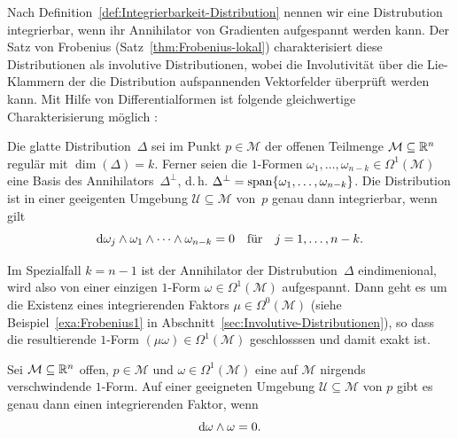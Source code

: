 Nach Definition~\ref{def:Integrierbarkeit-Distribution} nennen wir
eine Distrubution integrierbar, wenn ihr Annihilator von Gradienten
aufgespannt werden kann. Der Satz von Frobenius (Satz~\ref{thm:Frobenius-lokal})
charakterisiert diese Distributionen als involutive Distributionen,
wobei die Involutivität über die Lie-Klammern der die Distribution
aufspannenden Vektorfelder überprüft werden kann. Mit Hilfe von Differentialformen
ist folgende gleichwertige Charakterisierung möglich \cite{agricola2001,conte2007}:

\begin{theorem}
\label{satz:frobenius-formen}Die
glatte Distribution~$\Delta$ sei im Punkt $p\in\mathcal{M}$ der
offenen Teilmenge $\mathcal{M}\subseteq{\mathbb{R}}^{n}$ regulär mit $\dim(\Delta)=k$.
Ferner seien die $1$-Formen $\omega_{1},\dots,\omega_{n-k}\in\Omega^{1}(\mathcal{M})$
eine Basis des Annihilators~$\Delta^{\perp}$, d.\,h. $\Delta^{\perp}={\operatorname{span}}\{\omega_{1},\dots,\omega_{n-k}\}$.
Die Distribution ist in einer geeigenten Umgebung $\mathcal{U}\subseteq\mathcal{M}$
von~$p$ genau dann integrierbar, wenn gilt 
\[
{\mathrm{d}}\omega_{j}\wedge\omega_{1}\wedge\dots\wedge\omega_{n-k}=0\quad\text{für}\quad j=1,\ldots,n-k.
\]
\end{theorem}
Im Spezialfall $k=n-1$ ist der Annihilator der Distrubution~$\Delta$
eindimenional, wird also von einer einzigen $1$-Form $\omega\in\Omega^{1}(\mathcal{M})$
aufgespannt. Dann geht es um die Existenz eines integrierenden
Faktors $\mu\in\Omega^{0}(\mathcal{M})$ (siehe Beispiel~\ref{exa:Frobenius1}
in Abschnitt~\ref{sec:Involutive-Distributionen}), so dass die resultierende
$1$-Form $(\mu\omega)\in\Omega^{1}(\mathcal{M})$ geschlosssen und
damit exakt ist.
\begin{corollary}
\label{cor:frobenius-integrierender-faktor}Sei $\mathcal{M}\subseteq{\mathbb{R}}^{n}$
offen, $p\in\mathcal{M}$ und $\omega\in\Omega^{1}(\mathcal{M})$
eine auf $\mathcal{M}$ nirgends verschwindende $1$-Form. Auf einer
geeigneten Umgebung $\mathcal{U\subseteq\mathcal{M}}$ von $p$ gibt
es genau dann einen integrierenden Faktor, wenn 
\begin{equation}
{\mathrm{d}}\omega\wedge\omega=0.\label{eq:bedingung-integrierender-faktor}
\end{equation}
\end{corollary}
